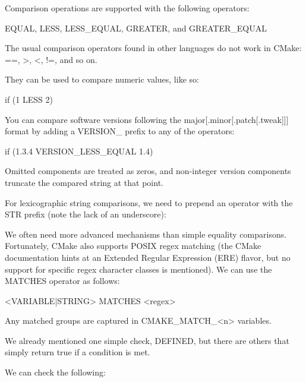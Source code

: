 
Comparison operations are supported with the following operators:

EQUAL, LESS, LESS\_EQUAL, GREATER, and GREATER\_EQUAL

The usual comparison operators found in other languages do not work in CMake: ==, >, <, !=, and so on.

They can be used to compare numeric values, like so:

\begin{cmake}
if (1 LESS 2)
\end{cmake}

You can compare software versions following the major[.minor[.patch[.tweak]]] format by adding a VERSION\_ prefix to any of the operators:

\begin{cmake}
if (1.3.4 VERSION_LESS_EQUAL 1.4)
\end{cmake}

Omitted components are treated as zeros, and non-integer version components truncate the compared string at that point.

For lexicographic string comparisons, we need to prepend an operator with the STR prefix (note the lack of an underscore):


We often need more advanced mechanisms than simple equality comparisons. Fortunately, CMake also supports POSIX regex matching (the CMake documentation hints at an Extended Regular Expression (ERE) flavor, but no support for specific regex character classes is mentioned). We can use the MATCHES operator as follows:

\begin{shell}
<VARIABLE|STRING> MATCHES <regex>
\end{shell}

Any matched groups are captured in CMAKE\_MATCH\_<n> variables.


We already mentioned one simple check, DEFINED, but there are others that simply return true if a condition is met.

We can check the following:

